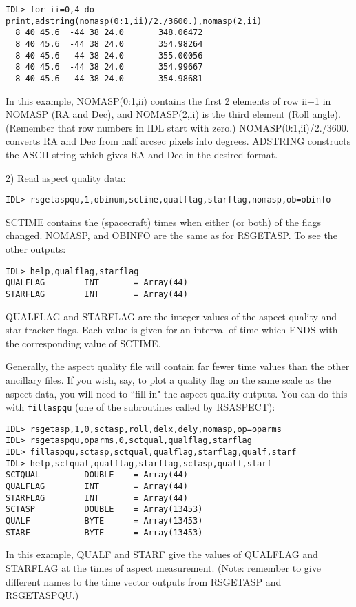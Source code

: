 \medskip\noindent
\begin{verbatim}
IDL> for ii=0,4 do print,adstring(nomasp(0:1,ii)/2./3600.),nomasp(2,ii)
  8 40 45.6  -44 38 24.0       348.06472
  8 40 45.6  -44 38 24.0       354.98264
  8 40 45.6  -44 38 24.0       355.00056
  8 40 45.6  -44 38 24.0       354.99667
  8 40 45.6  -44 38 24.0       354.98681
\end{verbatim}
In this example, NOMASP(0:1,ii) contains the first 2 elements of row ii+1 in
NOMASP (RA and Dec), and NOMASP(2,ii) is the third element (Roll angle).
(Remember that row numbers in IDL start with zero.) NOMASP(0:1,ii)/2./3600.
converts RA and Dec from half arcsec pixels into degrees. ADSTRING constructs
the ASCII string which gives RA and Dec in the desired format.
 
2) Read aspect quality data:

\medskip\noindent
\begin{verbatim}
IDL> rsgetaspqu,1,obinum,sctime,qualflag,starflag,nomasp,ob=obinfo
\end{verbatim}
SCTIME contains the (spacecraft) times when either (or both) of the flags
changed. NOMASP, and OBINFO are the same as for RSGETASP. To see the other
outputs:

\medskip\noindent
\begin{verbatim}
IDL> help,qualflag,starflag
QUALFLAG        INT       = Array(44)
STARFLAG        INT       = Array(44)
\end{verbatim}
QUALFLAG and STARFLAG are the integer values of the aspect quality and star
tracker flags. Each value is given for an interval of time which ENDS with the
corresponding value of SCTIME.
 
Generally, the aspect quality file will contain far fewer time values than the
other ancillary files. If you wish, say, to plot a quality flag on the same
scale as the aspect data, you will need to ``fill in" the aspect quality
outputs. You can do this with {\tt fillaspqu} (one of the subroutines called by
RSASPECT):

\medskip\noindent
\begin{verbatim}
IDL> rsgetasp,1,0,sctasp,roll,delx,dely,nomasp,op=oparms
IDL> rsgetaspqu,oparms,0,sctqual,qualflag,starflag
IDL> fillaspqu,sctasp,sctqual,qualflag,starflag,qualf,starf
IDL> help,sctqual,qualflag,starflag,sctasp,qualf,starf
SCTQUAL         DOUBLE    = Array(44)
QUALFLAG        INT       = Array(44)
STARFLAG        INT       = Array(44)
SCTASP          DOUBLE    = Array(13453)
QUALF           BYTE      = Array(13453)
STARF           BYTE      = Array(13453)
\end{verbatim}
In this example, QUALF and STARF give the values of QUALFLAG and STARFLAG at
the times of aspect measurement. (Note: remember to give different names to the
time vector outputs from RSGETASP and RSGETASPQU.)
 
